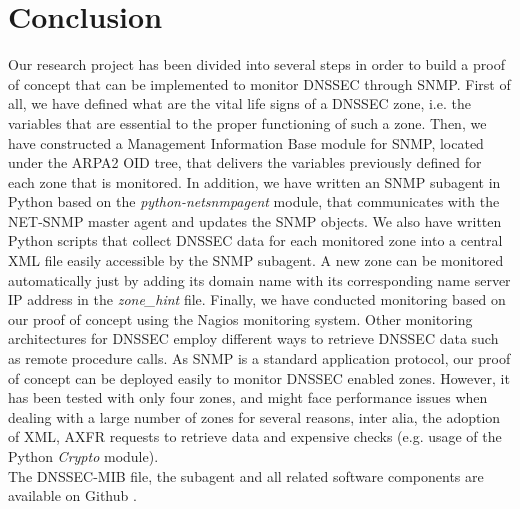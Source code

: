 \section{Conclusion}
\label{chap:conclusion}
Our research project has been divided into several steps in order to build a proof of concept that can be implemented to monitor DNSSEC through SNMP. First of all, we have defined what are the vital life signs of a DNSSEC zone, i.e. the variables that are essential to the proper functioning of such a zone. Then, we have constructed a Management Information Base module for SNMP, located under the ARPA2 OID tree, that delivers the variables previously defined for each zone that is monitored. In addition, we have written an SNMP subagent in Python based on the \textit{python-netsnmpagent} module, that communicates with the NET-SNMP master agent and updates the SNMP objects. We also have written Python scripts that collect DNSSEC data for each monitored zone into a central XML file easily accessible by the SNMP subagent. A new zone can be monitored automatically just by adding its domain name with its corresponding name server IP address in the \textit{zone\_hint} file. Finally, we have conducted monitoring based on our proof of concept using the Nagios monitoring system. Other monitoring architectures for DNSSEC employ different ways to retrieve DNSSEC data such as remote procedure calls. As SNMP is a standard application protocol, our proof of concept can be deployed easily to monitor DNSSEC enabled zones. However, it has been tested with only four zones, and might face performance issues when dealing with a large number of zones for several reasons, inter alia, the adoption of XML, AXFR requests to retrieve data and expensive checks (e.g. usage of the Python \textit{Crypto} module).
\\
The DNSSEC-MIB file, the subagent and all related software components are available on Github \cite{github}.


